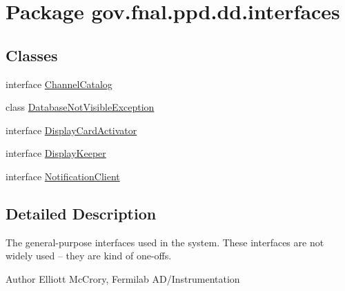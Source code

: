 \hypertarget{namespacegov_1_1fnal_1_1ppd_1_1dd_1_1interfaces}{\section{Package gov.\-fnal.\-ppd.\-dd.\-interfaces}
\label{namespacegov_1_1fnal_1_1ppd_1_1dd_1_1interfaces}
}
\subsection*{Classes}
\begin{DoxyCompactItemize}
\item 
interface \hyperlink{interfacegov_1_1fnal_1_1ppd_1_1dd_1_1interfaces_1_1ChannelCatalog}{Channel\-Catalog}
\item 
class \hyperlink{classgov_1_1fnal_1_1ppd_1_1dd_1_1interfaces_1_1DatabaseNotVisibleException}{Database\-Not\-Visible\-Exception}
\item 
interface \hyperlink{interfacegov_1_1fnal_1_1ppd_1_1dd_1_1interfaces_1_1DisplayCardActivator}{Display\-Card\-Activator}
\item 
interface \hyperlink{interfacegov_1_1fnal_1_1ppd_1_1dd_1_1interfaces_1_1DisplayKeeper}{Display\-Keeper}
\item 
interface \hyperlink{interfacegov_1_1fnal_1_1ppd_1_1dd_1_1interfaces_1_1NotificationClient}{Notification\-Client}
\end{DoxyCompactItemize}


\subsection{Detailed Description}
The general-\/purpose interfaces used in the system. These interfaces are not widely used -- they are kind of one-\/offs.

\begin{DoxyAuthor}{Author}
Elliott Mc\-Crory, Fermilab A\-D/\-Instrumentation 
\end{DoxyAuthor}
